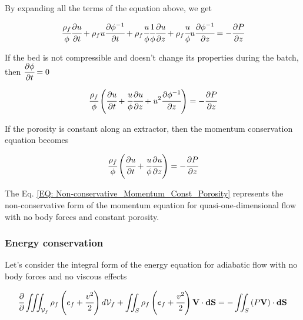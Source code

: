 \documentclass[../Article_Model_Parameters.tex]{subfiles}
\begin{document}
	By expanding all the terms of the equation above, we get
	
	{\footnotesize
		\begin{equation}
			\cfrac{\rho_f}{\phi} \cfrac{\partial u}{\partial t} + \rho_f u \cfrac{\partial \phi^{-1}}{\partial t} + \rho_f \cfrac{u}{\phi} \cfrac{1}{\phi} \cfrac{\partial u}{\partial z} + \rho_f \cfrac{u}{\phi} u \cfrac{\partial \phi^{-1} }{\partial z} = - \cfrac{\partial P}{\partial z}
		\end{equation}
	}
	
	If the bed is not compressible and doesn't change its properties during the batch, then ${\footnotesize\cfrac{\partial \phi}{\partial t}=0}$
	
	{\footnotesize
		\begin{equation}
			\cfrac{\rho_f}{\phi} \left( \cfrac{\partial u}{\partial t} + \cfrac{u}{\phi} \cfrac{\partial u}{\partial z} + u^2 \cfrac{\partial \phi^{-1}}{\partial z} \right) = -\cfrac{\partial P}{\partial z}
		\end{equation}
	}

	If the porosity is constant along an extractor, then the momentum conservation equation becomes
	
	{\footnotesize
		\begin{equation}
			\cfrac{\rho_f}{\phi} \left( \cfrac{\partial u}{\partial t} + \cfrac{u}{\phi} \cfrac{\partial u}{\partial z} \right) = -\cfrac{\partial P}{\partial z}
			\label{EQ: Non-conservative_Momentum_Const_Porosity}
		\end{equation}
	}

	The Eq. \ref{EQ: Non-conservative_Momentum_Const_Porosity} represents the non-conservative form of the momentum equation for quasi-one-dimensional flow with no body forces and constant porosity.
	
	\subsubsection{Energy conservation}
	
	Let's consider the integral form of the energy equation for adiabatic flow with no body forces and no viscous effects
	
	{\footnotesize
		\begin{equation}
			\cfrac{\partial}{\partial} \iiint_{\mathcal{V}_f} \rho_f \left( e_f + \cfrac{v^2}{2} \right) d\mathcal{V}_f + \iint_S \rho_f \left( e_f + \cfrac{v^2}{2} \right) \textbf{V} \cdot \textbf{dS} = - \iint_S \left( P\textbf{V} \right) \cdot \textbf{dS}
			\label{EQ: Energy_equation_integral}
		\end{equation}
	}
\end{document}

